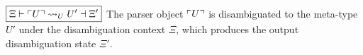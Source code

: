 \noindent $ \boxed{\Xi \vdash \ulcorner U\urcorner \rightsquigarrow_U U' \dashv \Xi'} $ \quad The parser object $ \ulcorner U\urcorner $ is disambiguated to the meta-type $ U' $ under the disambiguation context $ \Xi $, which produces the output disambiguation state $ \Xi' $.

